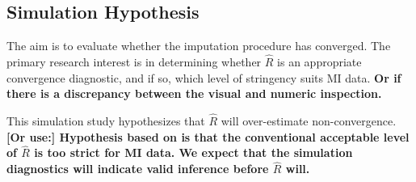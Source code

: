 \documentclass[article]{jss}
\begin{document}


\subsection{Simulation Hypothesis} \label{sec:hypothesis}

The aim is to evaluate whether the imputation procedure has converged. The primary research interest is in determining whether $\widehat{R}$ is an appropriate convergence diagnostic, and if so, which level of stringency suits MI data. \textbf{Or if there is a discrepancy between the visual and numeric inspection.}

This simulation study hypothesizes that $\widehat{R}$ will over-estimate non-convergence. \textbf{[Or use:] Hypothesis based on \cite{lace07} is that the conventional acceptable level of $\widehat{R}$ is too strict for MI data. We expect that the simulation diagnostics will indicate valid inference before $\widehat{R}$ will.}


% 
% 
% 
% 
\end{document}

